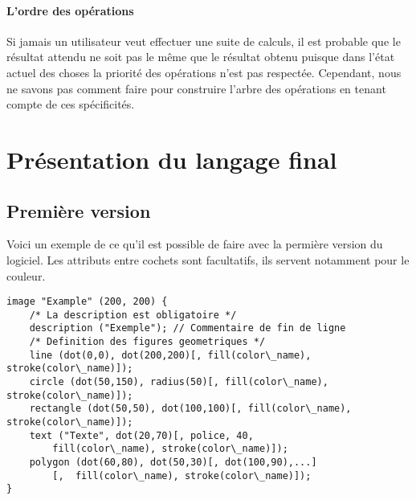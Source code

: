 			\subsubsection{L'ordre des opérations}
			Si jamais un utilisateur veut effectuer une suite de calculs, il est probable que le résultat attendu ne soit pas le même que le résultat obtenu puisque dans l'état actuel des choses la priorité des opérations n'est pas respectée. Cependant, nous ne savons pas comment faire pour construire l'arbre des opérations en tenant compte de ces spécificités.
			
		
\chapter{Présentation du langage final}
	\section{Première version}
	Voici un exemple de ce qu'il est possible de faire avec la permière version du logiciel. Les attributs entre cochets sont facultatifs, ils servent notamment pour le couleur.
	
\begin{lstlisting}[morekeywords={circle, dot, radius, image, description, line, rectangle, text, polygon}]
image "Example" (200, 200) {
	/* La description est obligatoire */
	description ("Exemple"); // Commentaire de fin de ligne
	/* Definition des figures geometriques */
	line (dot(0,0), dot(200,200)[, fill(color\_name), stroke(color\_name)]);
	circle (dot(50,150), radius(50)[, fill(color\_name), stroke(color\_name)]);
	rectangle (dot(50,50), dot(100,100)[, fill(color\_name), stroke(color\_name)]);
	text ("Texte", dot(20,70)[, police, 40,
		fill(color\_name), stroke(color\_name)]);
	polygon (dot(60,80), dot(50,30)[, dot(100,90),...]
		[,  fill(color\_name), stroke(color\_name)]);
}
\end{lstlisting}
	
	
